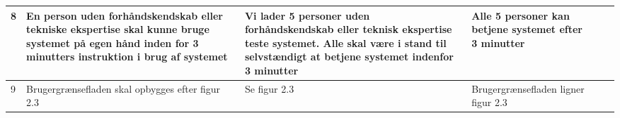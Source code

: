 \begin{table}[htbp]
\begin{tabular}{|p{0.5cm}|p{4cm}|p{3cm}|p{3cm}|p{2cm}|p{2cm}|}
 8 & En person uden forhåndskendskab eller tekniske ekspertise skal kunne bruge systemet på egen hånd inden for 3 minutters instruktion i brug af systemet & Vi lader 5 personer uden forhåndskendskab eller teknisk ekspertise teste systemet. Alle skal være i stand til selvstændigt at betjene systemet indenfor 3 minutter & Alle 5 personer kan betjene systemet efter 3 minutter & & \\\hline
 9 &Brugergrænsefladen skal opbygges efter figur 2.3 & Se figur 2.3 & Brugergrænsefladen ligner figur 2.3 & & \\\hline
\end{tabular}
\end{table}
